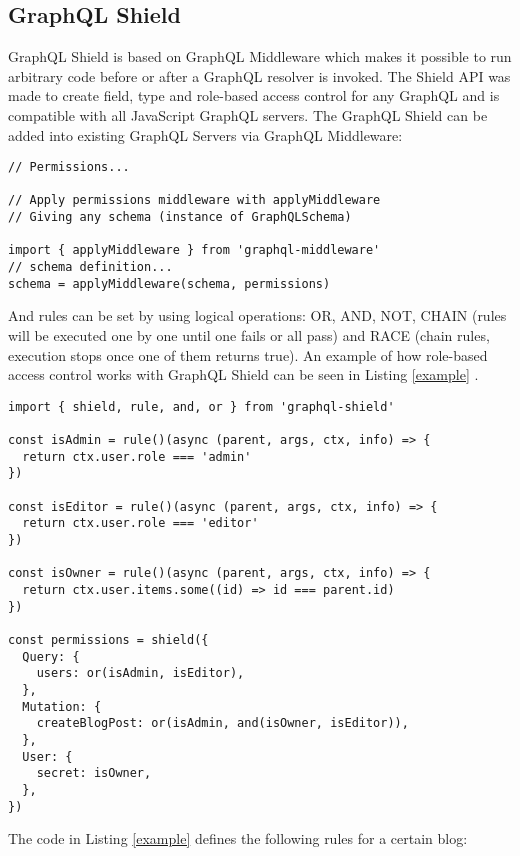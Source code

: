 \documentclass[conference]{IEEEtran}
\begin{document}
\subsection{GraphQL Shield}\label{shield}

GraphQL Shield is based on GraphQL Middleware which makes it possible to run arbitrary code before or after a GraphQL resolver is invoked. The Shield API was made to create field, type and role-based access control for any GraphQL and is compatible with all JavaScript GraphQL servers. The GraphQL Shield can be added into existing GraphQL Servers via GraphQL Middleware:

\begin{lstlisting}[label=some-code,caption=Integration \cite{b1}]
// Permissions...

// Apply permissions middleware with applyMiddleware
// Giving any schema (instance of GraphQLSchema)

import { applyMiddleware } from 'graphql-middleware'
// schema definition...
schema = applyMiddleware(schema, permissions)
\end{lstlisting}

And rules can be set by using logical operations: OR, AND, NOT, CHAIN (rules will be executed one by one until one fails or all pass) and RACE (chain rules, execution stops once one of them returns true). An example of how role-based access control works with GraphQL Shield can be seen in Listing \ref{example} .

\label{example}
\begin{lstlisting}[label=example,caption=Role-based Access Control \cite{b1}]
import { shield, rule, and, or } from 'graphql-shield'

const isAdmin = rule()(async (parent, args, ctx, info) => {
  return ctx.user.role === 'admin'
})

const isEditor = rule()(async (parent, args, ctx, info) => {
  return ctx.user.role === 'editor'
})

const isOwner = rule()(async (parent, args, ctx, info) => {
  return ctx.user.items.some((id) => id === parent.id)
})

const permissions = shield({
  Query: {
    users: or(isAdmin, isEditor),
  },
  Mutation: {
    createBlogPost: or(isAdmin, and(isOwner, isEditor)),
  },
  User: {
    secret: isOwner,
  },
})
\end{lstlisting}

The code in Listing \ref{example} defines the following rules for a certain blog:
\end{document}
